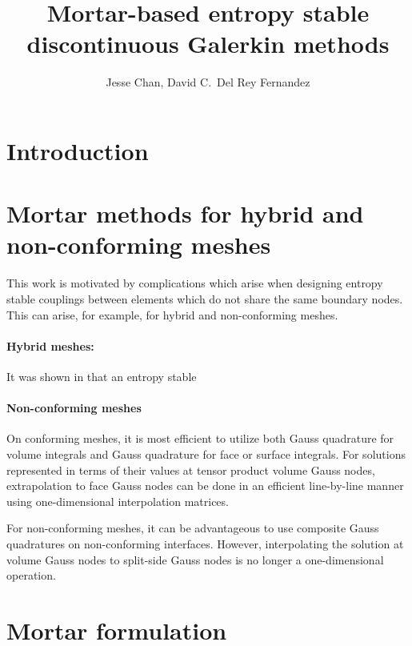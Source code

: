 \documentclass[review]{siamart0216}
\author{Jesse Chan, David C.\ Del Rey Fernandez}
\title{Mortar-based entropy stable discontinuous Galerkin methods}
\newcommand{\note}[1]{{\color{blue}{#1}}}
\begin{document}
\maketitle

\section{Introduction}

\note{Boilerplate introduction on high order + stability}



\section{Mortar methods for hybrid and non-conforming meshes}

This work is motivated by complications which arise when designing entropy stable couplings between elements which do not share the same boundary nodes.  This can arise, for example, for hybrid and non-conforming meshes.  

\paragraph{Hybrid meshes:} It was shown in \cite{chan2018skew} that an entropy stable 

\paragraph{Non-conforming meshes}

On conforming meshes, it is most efficient to utilize both Gauss quadrature for volume integrals and Gauss quadrature for face or surface integrals.  For solutions represented in terms of their values at tensor product volume Gauss nodes, extrapolation to face Gauss nodes can be done in an efficient line-by-line manner using one-dimensional interpolation matrices.  

For non-conforming meshes, it can be advantageous to use composite Gauss quadratures on non-conforming interfaces.  \note{Reference JK and LCW's paper on full-side vs split side mortars.}  However, interpolating the solution at volume Gauss nodes to split-side Gauss nodes is no longer a one-dimensional operation.

\section{Mortar formulation}
\end{document}
